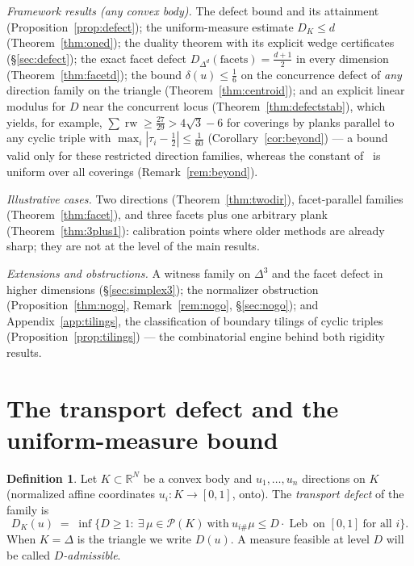 \documentclass[11pt,reqno]{amsart}
\theoremstyle{plain}
\theoremstyle{definition}
\newtheorem{definition}[theorem]{Definition}
\theoremstyle{remark}
\newcommand{\rw}{\operatorname{rw}}
\newcommand{\Leb}{\operatorname{Leb}}
\newcommand{\R}{\mathbb{R}}
\begin{document}
\emph{Framework results (any convex body).} The defect bound and its
attainment (Proposition~\ref{prop:defect}); the uniform-measure estimate
$D_K\le d$ (Theorem~\ref{thm:oned}); the duality theorem with its explicit
wedge certificates (\S\ref{sec:defect}); the exact facet defect
$D_{\Delta^d}(\text{facets})=\tfrac{d+1}2$ in every dimension
(Theorem~\ref{thm:facetd}); the bound $\delta(u)\le\tfrac16$ on the concurrence
defect of \emph{any} direction family on the triangle
(Theorem~\ref{thm:centroid}); and an explicit linear modulus for $D$ near the
concurrent locus (Theorem~\ref{thm:defectstab}), which yields, for example,
$\sum\rw\ge\tfrac{27}{29}>4\sqrt3-6$ for coverings by planks parallel to any
cyclic triple with $\max_i|\tau_i-\tfrac12|\le\tfrac1{60}$
(Corollary~\ref{cor:beyond}) --- a bound valid only for these restricted
direction families, whereas the constant of~\cite{BY26} is uniform over all
coverings (Remark~\ref{rem:beyond}).

\emph{Illustrative cases.} Two directions (Theorem~\ref{thm:twodir}),
facet-parallel families (Theorem~\ref{thm:facet}), and three facets plus one
arbitrary plank (Theorem~\ref{thm:3plus1}): calibration points where older
methods are already sharp; they are not at the level of the main results.

\emph{Extensions and obstructions.} A witness family on $\Delta^3$ and the
facet defect in higher dimensions (\S\ref{sec:simplex3}); the normalizer
obstruction (Proposition~\ref{thm:nogo}, Remark~\ref{rem:nogo},
\S\ref{sec:nogo}); and Appendix~\ref{app:tilings}, the classification of
boundary tilings of cyclic triples (Proposition~\ref{prop:tilings}) --- the
combinatorial engine behind both rigidity results.

\section{The transport defect and the uniform-measure bound}\label{sec:measure}

\begin{definition}\label{def:defect}
Let $K\subset\R^N$ be a convex body and $u_1,\dots,u_n$ directions on $K$
(normalized affine coordinates $u_i:K\to[0,1]$, onto). The \emph{transport
defect} of the family is
\[
D_K(u)\;=\;\inf\bigl\{D\ge1:\ \exists\,\mu\in\mathcal P(K)\ \text{with}\
u_{i\#}\mu\le D\cdot\Leb\ \text{on }[0,1]\ \text{for all }i\bigr\}.
\]
When $K=\Delta$ is the triangle we write $D(u)$. A measure feasible at level
$D$ will be called \emph{$D$-admissible}.
\end{definition}
\end{document}
